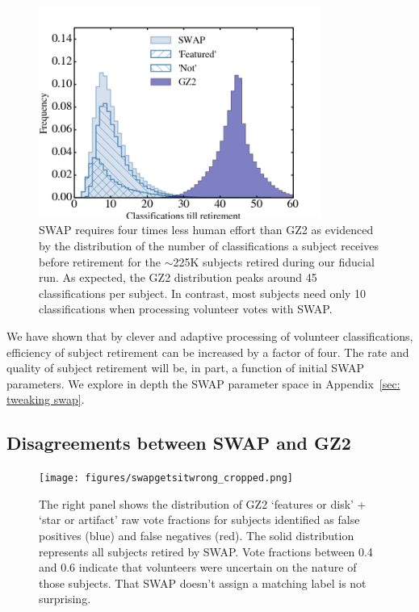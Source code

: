 \documentclass[twocolumn]{aastex6}
\begin{document}
\begin{figure}[t!]
\includegraphics[width=3.65in]{figures/GZX_clicks_till_retired_baseline.png}
\caption{SWAP requires four times less human effort than GZ2 as evidenced by the distribution of the number of classifications a subject receives before retirement for the $\sim$225K subjects retired during our fiducial run.  As expected, the GZ2 distribution peaks around 45 classifications per subject. In contrast, most subjects need only 10 classifications when processing volunteer votes with SWAP.  \label{fig: swap vote distributions}}
\end{figure}



We have shown that by clever and adaptive processing of volunteer classifications, 
efficiency of subject retirement can be increased by a factor of four. 
The rate and quality of subject retirement will be, in part, a function of initial 
SWAP parameters. We explore in depth the SWAP parameter
space in Appendix~\ref{sec: tweaking swap}.




\subsection{Disagreements between SWAP and GZ2}

\begin{figure}[t!]
\texttt{[image: figures/swapgetsitwrong\_cropped.png]}
\caption{The right panel shows the distribution of GZ2 `features or disk' + `star or artifact'  raw vote fractions for subjects identified as false positives (blue) and false negatives (red). The solid distribution represents all subjects retired by SWAP. Vote fractions between 0.4 and 0.6 indicate that volunteers were uncertain on the nature of those subjects.  That SWAP doesn't assign a matching label is not surprising.  \label{fig: SWAP sucks}}
\end{figure}
\end{document}
